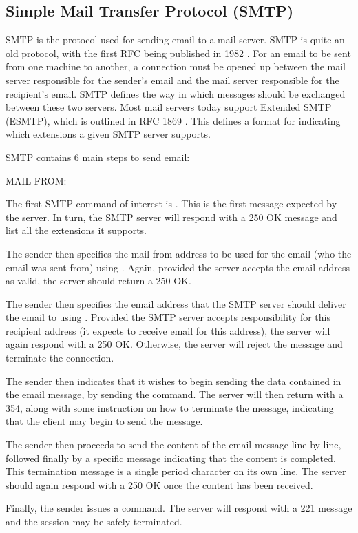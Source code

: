 \subsection{Simple Mail Transfer Protocol (SMTP)} \label{sec:smtp}
SMTP is the protocol used for sending email to a mail server. SMTP is quite an old protocol, with the first RFC being published in 1982 \cite{smtpRfc}. For an email to be sent from one machine to another, a connection must be opened up between the mail server responsible for the sender's email and the mail server responsible for the recipient's email. SMTP defines the way in which messages should be exchanged between these two servers. Most mail servers today support 
Extended SMTP (ESMTP), which is outlined in RFC 1869 \cite{esmtpRfc}. This defines a format for indicating which extensions a given SMTP server supports. 

SMTP contains 6 main steps to send email:
\begin{labeling}{MAIL FROM: }
  \item[EHLO] The first SMTP command of interest is . This is the first message expected by the server. In turn, the SMTP server will respond with a 250 OK message and list all the extensions it supports. 
  \item[MAIL FROM:] The sender then specifies the mail from address to be used for the email (who the email was sent from) using . Again, provided the server accepts the email address as valid, the server should return a 250 OK.
  \item[RCPT TO:] The sender then specifies the email address that the SMTP server should deliver the email to using . Provided the SMTP server accepts responsibility for this recipient address (it expects to receive email for this address), the server will again respond with a 250 OK. Otherwise, the server will reject the message and terminate the connection.
  \item[DATA] The sender then indicates that it wishes to begin sending the data contained in the email message, by sending the  command. The server will then return with a 354, along with some instruction on how to terminate the message, indicating that the client may begin to send the message.
  \item[<content>] The sender then proceeds to send the content of the email message line by line, followed finally by a specific message indicating that the content is completed. This termination message is a single period character on its own line. The server should again respond with a 250 OK once the content has been received.
  \item[QUIT] Finally, the sender issues a  command. The server will respond with a 221 message and the session may be safely terminated.
\end{labeling}

